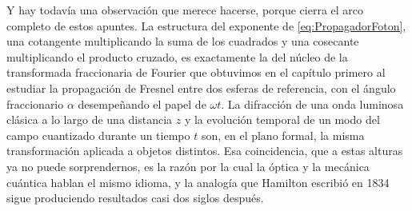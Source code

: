         Y hay todavía una observación que merece hacerse, porque cierra el arco completo de estos apuntes. La estructura del exponente de \eqref{eq:PropagadorFoton}, una cotangente multiplicando la suma de los cuadrados y una cosecante multiplicando el producto cruzado, es exactamente la del núcleo de la transformada fraccionaria de Fourier que obtuvimos en el capítulo primero al estudiar la propagación de Fresnel entre dos esferas de referencia, con el ángulo fraccionario $\alpha$ desempeñando el papel de $\omega t$. La difracción de una onda luminosa clásica a lo largo de una distancia $z$ y la evolución temporal de un modo del campo cuantizado durante un tiempo $t$ son, en el plano formal, la misma transformación aplicada a objetos distintos. Esa coincidencia, que a estas alturas ya no puede sorprendernos, es la razón por la cual la óptica y la mecánica cuántica hablan el mismo idioma, y la analogía que Hamilton escribió en 1834 sigue produciendo resultados casi dos siglos después.

